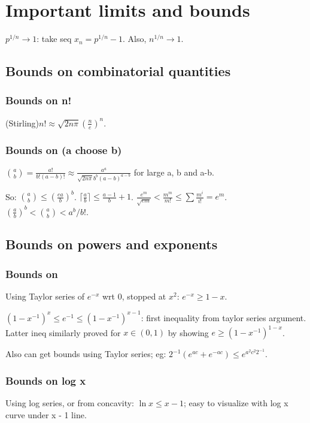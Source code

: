 \documentclass[oneside, article]{memoir}
\begin{document}
\chapter{Important limits and bounds}
$p^{1/n} \to 1$: take seq $x_{n} = p^{1/n}-1$. Also, $n^{1/n} \to 1$.

\section{Bounds on combinatorial quantities}
\subsection{Bounds on n!}
(Stirling)$n!\approx \sqrt{2n\pi} (\frac{n}{e})^{n}$. \why

\subsection{Bounds on (a choose b)}
$\binom{a}{b} = \frac{a!}{b!(a-b)!} \approx \frac{a^{a}}{\sqrt{2n\pi} b^{b}(a-b)^{a-b}}$ for large a, b and a-b.

So: $\binom{a}{b} \leq (\frac{ea}{b})^{b}$. $\lceil \frac{a}{b}\rceil \leq \frac{a-1}{b}+1$. $\frac{e^{m}}{\sqrt{em}}< \frac{m^{m}}{m!}\leq \sum \frac{m^{i}}{i!} = e^{m}$. $(\frac{a}{b})^{b} < \binom{a}{b} < a^{b}/b!$.

\section{Bounds on powers and exponents}
\subsection{Bounds on }
Using Taylor series of $e^{-x}$ wrt 0, stopped at $x^{2}$: $e^{-x} \geq 1-x$.

$(1-x^{-1})^{x} \leq e^{-1} \leq (1-x^{-1})^{x-1}$: first inequality from taylor series argument. Latter ineq similarly proved for $x \in (0, 1)$ by showing $e \geq (1-x^{-1})^{1-x}$.

Also can get bounds using Taylor series; eg: $2^{-1}(e^{ac}+e^{-ac}) \leq e^{a^{2}c^{2}2^{-1}}$.

\subsection{Bounds on log x}
Using log series, or from concavity: $\ln x \leq x-1$; easy to visualize with log x curve under x - 1 line.
\end{document}
